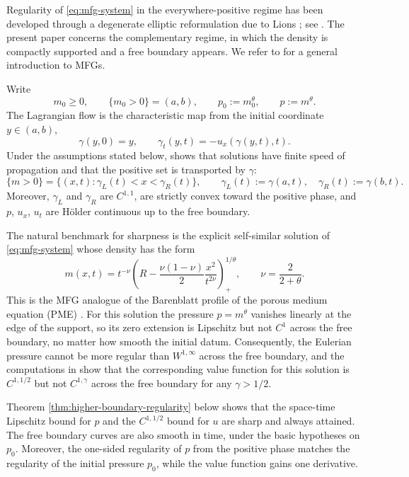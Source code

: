 \documentclass[11pt]{amsart}
\begin{document}
Regularity of \eqref{eq:mfg-system} in the everywhere-positive regime has been
developed through a degenerate elliptic reformulation due to Lions
\cite{Lions}; see \cite{Munoz22,MSM24,Porretta23}. The present paper concerns
the complementary regime, in which the density is compactly supported and a
free boundary appears. We refer to \cite{CP20} for a general introduction to
MFGs.

Write
\[
        m_0\ge0,\qquad \{m_0>0\}=(a,b),\qquad p_0:=m_0^\theta,\qquad
        p:=m^\theta.
\]
The Lagrangian flow is the characteristic map from the initial coordinate
\(y\in(a,b)\),
\[
        \gamma(y,0)=y,\qquad
        \gamma_t(y,t)=-u_x(\gamma(y,t),t).
\]
Under the assumptions stated below, \cite{CMP} shows that solutions have
finite speed of propagation and that the positive set is transported by
\(\gamma\):
\[
        \{m>0\}
        =\{(x,t):\gamma_L(t)<x<\gamma_R(t)\},\qquad
        \gamma_L(t):=\gamma(a,t),\quad
        \gamma_R(t):=\gamma(b,t).
\]
Moreover, \(\gamma_L\) and \(\gamma_R\) are \(C^{1,1}\), are strictly convex
toward the positive phase, and \(p\), \(u_x\), \(u_t\) are H\"older
continuous up to the free boundary.

The natural benchmark for sharpness is the explicit
self-similar solution of \eqref{eq:mfg-system} whose density has the form
\begin{equation*}
        m(x,t)=t^{-\nu}
        \left(R-\frac{\nu(1-\nu)}2\frac{x^2}{t^{2\nu}}
        \right)_+^{1/\theta},
        \qquad \nu=\frac2{2+\theta}.
\end{equation*}
This is the MFG analogue of the Barenblatt profile of the porous medium
equation (PME) \cite{Barenblatt,Vazquez}. For this solution the pressure
\(p=m^\theta\) vanishes linearly at the edge of the support, so its zero
extension is Lipschitz but not \(C^1\) across the free boundary, no matter how
smooth the initial datum. Consequently, the Eulerian pressure cannot be more
regular than \(W^{1,\infty}\) across the free boundary, and the computations in
\cite[App.~A]{CMP} show that the corresponding value function for this solution
is \(C^{1,1/2}\) but not \(C^{1,\gamma}\) across the free boundary for any
\(\gamma>1/2\).

Theorem
\ref{thm:higher-boundary-regularity} below shows that the space-time
Lipschitz bound for \(p\) and the \(C^{1,1/2}\) bound for \(u\) are sharp
and always attained. The free
boundary curves are also smooth in time, under the basic hypotheses on \(p_0\).
Moreover, the one-sided regularity of \(p\) from
the positive phase matches the regularity of the initial pressure \(p_0\),
while the value function gains one derivative.
\end{document}
